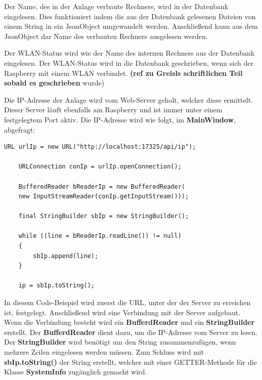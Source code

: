 \vspace{10pt}

Der Name, des in der Anlage verbaute Rechners, wird in der Datenbank eingelesen. Dies funktioniert indem die aus der Datenbank gelesenen Dateien von einem String in ein JsonObject umgewandelt werden. Anschließend kann aus dem JsonObject dar Name des verbauten Rechners ausgelesen werden.

\vspace{50pt}

Der WLAN-Status wird wie der Name des internen Rechners aus der Datenbank eingelesen. Der WLAN-Status wird in die Datenbank geschrieben, wenn sich der Raspberry mit einem WLAN verbindet. \textbf{(ref zu Greisls schriftlichen Teil sobald es geschrieben} wurde)

\vspace{10pt}

Die IP-Adresse der Anlage wird vom Web-Server geholt, welcher diese ermittelt. Dieser Server läuft ebenfalls am Raspberry und ist immer unter einem festgelegtem Port aktiv. Die IP-Adresse wird wie folgt, im \textbf{MainWindow}, abgefragt:
\begin{lstlisting}[style=JavaStyle, caption=Abfragen der IP-Adresse]
	URL urlIp = new URL("http://localhost:17325/api/ip");
	
	URLConnection conIp = urlIp.openConnection();
	
	BufferedReader bReaderIp = new BufferedReader(
	new InputStreamReader(conIp.getInputStream()));    
	
	final StringBuilder sbIp = new StringBuilder();
	
	while ((line = bReaderIp.readLine()) != null)
	{
		sbIp.append(line);
	}
            
	ip = sbIp.toString();    
\end{lstlisting}
In diesem Code-Beispiel wird zuerst die URL, unter der der Server zu erreichen ist, festgelegt. Anschließend wird eine Verbindung mit der Server aufgebaut. Wenn die Verbindung besteht wird ein \textbf{BufferdReader} und ein \textbf{StringBuilder} erstellt. Der \textbf{BufferdReader} dient dazu, um die IP-Adresse vom Server zu lesen. Der \textbf{StringBuilder} wird benötigt um den String zusammenzufügen, wenn mehrere Zeilen eingelesen werden müssen. Zum Schluss wird mit \textbf{sbIp.toString()} der String erstellt, welcher mit einer GETTER-Methode für die Klasse \textbf{SystemInfo} zugänglich gemacht wird.

\vspace{10pt}

